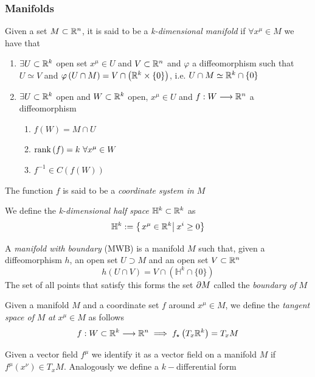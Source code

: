 \documentclass[../complete.tex]{subfiles}
\begin{document}
\subsubsection{Manifolds}
\begin{dfn}[Manifold]
	Given a set $M\subset\mathbb{R}^n$, it is said to be a \textit{k-dimensional manifold} if $\forall x^\mu\in M$ we have that
	\begin{enumerate}
	\item $\exists U\subset\mathbb{R}^k$ open set $x^\mu\in U$ and $V\subset\mathbb{R}^n$ and $\varphi$ a diffeomorphism such that $U\simeq V$ and $\varphi\left( U\cap M \right)=V\cap\left( \mathbb{R}^k\times\{0\} \right)$, i.e. $U\cap M\simeq\mathbb{R}^k\cap\{0\}$
	\item $\exists U\subset\mathbb{R}^k$ open and $W\subset\mathbb{R}^k$ open, $x^\mu\in U$ and $f:W\overset{}{\longrightarrow}\mathbb{R}^n$ a diffeomorphism
		\begin{enumerate}
		\item $f(W)=M\cap U$
		\item $\rank\left( f \right)=k\ \forall x^\mu\in W$
		\item $f^{-1}\in C(f(W))$
		\end{enumerate}
	\end{enumerate}
	The function $f$ is said to be a \textit{coordinate system in} $M$
\end{dfn}
\begin{dfn}
	We define the \textit{k-dimensional half space} $\mathbb{H}^k\subset\mathbb{R}^k$ as
	\begin{equation}
		\mathbb{H}^k:=\left\{ \left.x^\mu\in\mathbb{R}^k\right|_{}x^i\ge0 \right\}
		\label{eq:halfspacerk}
	\end{equation}
\end{dfn}
\begin{dfn}
	A \textit{manifold with boundary} (MWB) is a manifold $M$ such that, given a diffeomorphism $h$, an open set $U\supset M$ and an open set $V\subset\mathbb{R}^n$
	\begin{equation}
		h\left( U\cap V \right)=V\cap\left( \mathbb{H}^k\cap\{0\} \right)
		\label{eq:manifoldwb}
	\end{equation}
	The set of all points that satisfy this forms the set $\partial M$ called the \textit{boundary of} $M$
\end{dfn}
\begin{dfn}
	Given a manifold $M$ and a coordinate set $f$ around $x^\mu\in M$, we define the \textit{tangent space of} $M$ \textit{at} $x^\mu\in M$ as follows
	\begin{equation}
		f:W\subset\mathbb{R}^k\overset{}{\longrightarrow}\mathbb{R}^n\implies{} f_{\star}\left( T_x\mathbb{R}^k \right)=T_xM
		\label{eq:tangentspaceman}
	\end{equation}
\end{dfn}
\begin{dfn}
	Given a vector field $f^\mu$ we identify it as a vector field on a manifold $M$ if $f^\mu(x^\nu)\in T_xM$. Analogously we define a $k-$differential form
\end{dfn}
\end{document}

